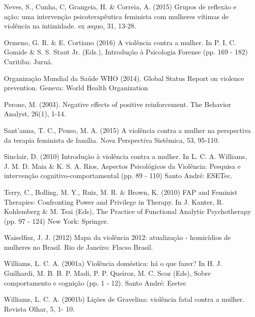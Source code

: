 \hangindent=25pt
\noindent Neves, S., Cunha, C, Grangeia, H. \& Correia, A. (2015) Grupos de reflexão e ação: uma intervenção psicoterapêutica feminista com mulheres vítimas de violência na intimidade. ex æquo, 31, 13-28.

\hangindent=25pt
\noindent Ormeno, G. R. \& E. Cortiano (2016) A violência contra a mulher. In P. I. C. Gomide \& S. S. Staut Jr. (Eds.), Introdução à Psicologia Forense (pp. 169 - 182) Curitiba: Juruá.

\hangindent=25pt
\noindent Organização Mundial da Saúde WHO (2014). Global Status Report on violence prevention. Geneva: World Health Organization

\hangindent=25pt
\noindent Perone, M. (2003). Negative effects of positive reinforcement. The Behavior Analyst, 26(1), 1-14.

\hangindent=25pt
\noindent Sant’anna, T. C., Penso, M. A. (2015) A violência contra a mulher na perspectiva da terapia feminista de família. Nova Perspectiva Sistêmica, 53, 95-110.

\hangindent=25pt
\noindent Sinclair, D. (2010) Introdução à violência contra a mulher. In L. C. A. Williams, J. M. D. Maia \& K. S. A. Rios, Aspectos Psicológicos da Violência: Pesquisa e intervenção cognitivo-comportamental (pp. 89 - 110) Santo André: ESETec.

\hangindent=25pt
\noindent Terry, C., Bolling, M. Y., Ruiz, M. R. \& Brown, K. (2010) FAP and Feminist Therapies: Confronting Power and Privilege in Therapy. In J. Kanter, R. Kohlemberg \& M. Tsai (Eds), The Practice of Functional Analytic Psychotherapy (pp. 97 - 124) New York: Springer.

\hangindent=25pt
\noindent Waiselfisz, J. J. (2012) Mapa da violência 2012: atualização - homicídios de mulheres no Brasil. Rio de Janeiro: Flacso Brasil.

\hangindent=25pt
\noindent Williams, L. C. A. (2001a) Violência doméstica: há o que fazer? In H. J. Guilhardi, M. B. B. P. Madi, P. P. Queiroz, M. C. Scoz (Eds), Sobre comportamento e cognição (pp. 1 - 12). Santo André: Esetec

\hangindent=25pt
\noindent Williams, L. C. A. (2001b) Lições de Gravelina: violência fatal contra a mulher. Revista Olhar, 5, 1- 10.